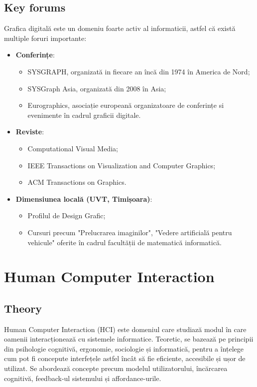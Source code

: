\documentclass[12pt, letterpaper]{article}
\begin{document}
\subsection*{Key forums}
Grafica digitală este un domeniu foarte activ al informaticii, astfel că există multiple foruri importante:
\begin{itemize}
    \item \textbf{Conferințe}:
    \begin{itemize}
        \item SYSGRAPH, organizată in fiecare an încă din 1974 în America de Nord;
        \item SYSGraph Asia, organizată din 2008 în Asia;
        \item Eurographics, asociație europeană organizatoare de conferințe si evenimente în cadrul graficii digitale.
    \end{itemize}
    
    \item \textbf{Reviste}:
    \begin{itemize}
        \item Computational Visual Media;
        \item IEEE Transactions on Visualization and Computer Graphics;
        \item ACM Transactions on Graphics.
    \end{itemize}  
    
    \item  \textbf{Dimensiunea locală (UVT, Timișoara)}: 
    \begin{itemize}
        \item Profilul de Design Grafic;
        \item Cursuri precum "Prelucrarea imaginilor", "Vedere artificială pentru vehicule" oferite în cadrul facultății de matematică informatică.
    \end{itemize}
\end{itemize}

\newpage

\section{Human Computer Interaction}

\subsection*{Theory}
Human Computer Interaction (HCI) este domeniul care studiază modul în care oamenii interacționează cu sistemele informatice. Teoretic, se bazează pe principii din psihologie cognitivă, ergonomie, sociologie și informatică, pentru a înțelege cum pot fi concepute interfețele astfel încât să fie eficiente, accesibile și ușor de utilizat. Se abordează concepte precum modelul utilizatorului, încărcarea cognitivă, feedback-ul sistemului și affordance-urile.
\end{document}
